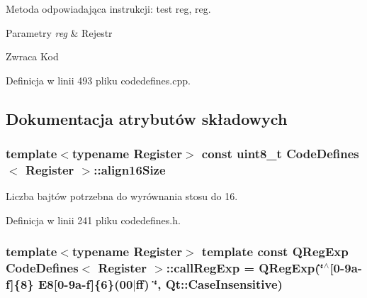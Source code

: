Metoda odpowiadająca instrukcji\-: test reg, reg. 


\begin{DoxyParams}{Parametry}
{\em reg} & Rejestr \\
\hline
\end{DoxyParams}
\begin{DoxyReturn}{Zwraca}
Kod 
\end{DoxyReturn}


Definicja w linii 493 pliku codedefines.\-cpp.



\subsection{Dokumentacja atrybutów składowych}
\hypertarget{class_code_defines_a83820641d7045e035f2a4619a23d2755}{
\subsubsection[{align16\-Size}]{\setlength{\rightskip}{0pt plus 5cm}template$<$typename Register$>$ const uint8\-\_\-t {\bf Code\-Defines}$<$ Register $>$\-::align16\-Size\hspace{0.3cm}{\ttfamily [static]}}}\label{class_code_defines_a83820641d7045e035f2a4619a23d2755}


Liczba bajtów potrzebna do wyrównania stosu do 16. 



Definicja w linii 241 pliku codedefines.\-h.

\hypertarget{class_code_defines_a54f3fde2a7976ac5c36b9a9aa2efb37e}{
\subsubsection[{call\-Reg\-Exp}]{\setlength{\rightskip}{0pt plus 5cm}template$<$typename Register$>$ template const Q\-Reg\-Exp {\bf Code\-Defines}$<$ Register $>$\-::call\-Reg\-Exp = Q\-Reg\-Exp(\char`\"{}$^\wedge$\mbox{[}0-\/9a-\/f\mbox{]}\{8\} E8\mbox{[}0-\/9a-\/f\mbox{]}\{6\}(00$|$ff) \char`\"{}, Qt\-::\-Case\-Insensitive)\hspace{0.3cm}{\ttfamily [static]}}}\label{class_code_defines_a54f3fde2a7976ac5c36b9a9aa2efb37e}


